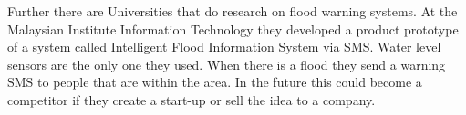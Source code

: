 Further there are Universities that do research on flood warning systems. At the Malaysian Institute Information Technology they developed a product prototype of a system called Intelligent Flood Information System via SMS. Water level sensors are the only one they used. When there is a flood they send a warning SMS to people that are within the area. In the future this could become a competitor if they create a start-up or sell the idea to a company.  




